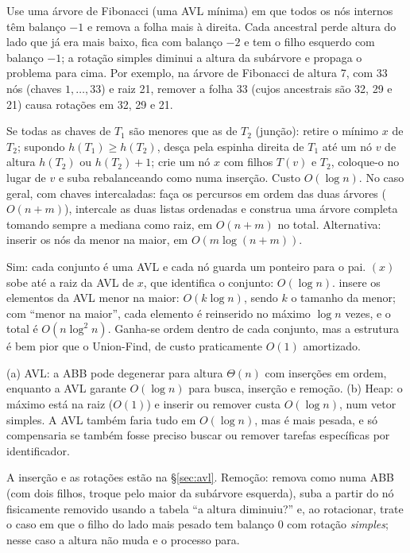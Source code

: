  Use uma árvore de Fibonacci (uma AVL mínima) em que todos os nós internos têm balanço $-1$ e remova a folha mais à direita. Cada ancestral perde altura do lado que já era mais baixo, fica com balanço $-2$ e tem o filho esquerdo com balanço $-1$; a rotação simples diminui a altura da subárvore e propaga o problema para cima. Por exemplo, na árvore de Fibonacci de altura 7, com 33 nós (chaves $1,\dots,33$) e raiz 21, remover a folha 33 (cujos ancestrais são 32, 29 e 21) causa rotações em 32, 29 e 21.

 Se todas as chaves de $T_1$ são menores que as de $T_2$ (junção): retire o mínimo $x$ de $T_2$; supondo $h(T_1)\ge h(T_2)$, desça pela espinha direita de $T_1$ até um nó $v$ de altura $h(T_2)$ ou $h(T_2)+1$; crie um nó $x$ com filhos $T(v)$ e $T_2$, coloque-o no lugar de $v$ e suba rebalanceando como numa inserção. Custo $O(\log n)$. No caso geral, com chaves intercaladas: faça os percursos em ordem das duas árvores ($O(n+m)$), intercale as duas listas ordenadas e construa uma árvore completa tomando sempre a mediana como raiz, em $O(n+m)$ no total. Alternativa: inserir os nós da menor na maior, em $O(m\log(n+m))$.

 Sim: cada conjunto é uma AVL e cada nó guarda um ponteiro para o pai. \Find$(x)$ sobe até a raiz da AVL de $x$, que identifica o conjunto: $O(\log n)$. \Union{} insere os elementos da AVL menor na maior: $O(k\log n)$, sendo $k$ o tamanho da menor; com ``menor na maior'', cada elemento é reinserido no máximo $\log n$ vezes, e o total é $O(n\log^2n)$. Ganha-se ordem dentro de cada conjunto, mas a estrutura é bem pior que o Union-Find, de custo praticamente $O(1)$ amortizado.

 (a) AVL: a ABB pode degenerar para altura $\Theta(n)$ com inserções em ordem, enquanto a AVL garante $O(\log n)$ para busca, inserção e remoção. (b) Heap: o máximo está na raiz ($O(1)$) e inserir ou remover custa $O(\log n)$, num vetor simples. A AVL também faria tudo em $O(\log n)$, mas é mais pesada, e só compensaria se também fosse preciso buscar ou remover tarefas específicas por identificador.

 A inserção e as rotações estão na §\ref{sec:avl}. Remoção: remova como numa ABB (com dois filhos, troque pelo maior da subárvore esquerda), suba a partir do nó fisicamente removido usando a tabela ``a altura diminuiu?'' e, ao rotacionar, trate o caso em que o filho do lado mais pesado tem balanço 0 com rotação \emph{simples}; nesse caso a altura não muda e o processo para.

